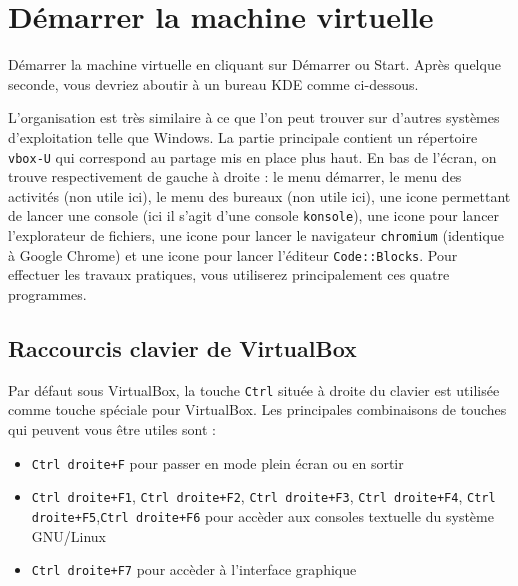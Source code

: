  
\begin{center}
\end{center}


 \section{Démarrer la machine virtuelle}

Démarrer la machine virtuelle en cliquant sur \og{}Démarrer\fg{} ou \og{}Start\fg{}. Après quelque seconde, vous devriez aboutir à un bureau KDE comme ci-dessous. 

\begin{center}
\end{center}

L'organisation est très similaire à ce que l'on peut trouver sur d'autres systèmes d'exploitation telle que Windows. La partie principale contient un répertoire \og{}\verb|vbox-U| qui correspond au partage mis en place plus haut. En bas de l'écran, on trouve respectivement de gauche à droite : le menu démarrer, le menu des activités (non utile ici), le menu des bureaux (non utile ici), une icone permettant de lancer une console (ici il s'agit d'une console \verb-konsole-), une icone pour lancer l'explorateur de fichiers, une icone pour lancer le navigateur \verb-chromium- (identique à Google Chrome) et une icone pour lancer l'éditeur \verb-Code::Blocks-.
Pour effectuer les travaux pratiques, vous utiliserez principalement ces quatre programmes.

\subsection{Raccourcis clavier de VirtualBox}
Par défaut sous VirtualBox, la touche \verb-Ctrl- située à droite du clavier est utilisée comme touche spéciale pour VirtualBox. Les principales combinaisons de touches qui peuvent vous être utiles sont :
\begin{itemize}
  \item \verb-Ctrl droite+F- pour passer en mode plein écran ou en sortir
  \item \verb-Ctrl droite+F1-, \verb-Ctrl droite+F2-, \verb-Ctrl droite+F3-, \verb-Ctrl droite+F4-, \verb-Ctrl droite+F5-,\newline \verb-Ctrl droite+F6- pour accèder aux consoles textuelle du système GNU/Linux
  \item \verb-Ctrl droite+F7- pour accèder à l'interface graphique
\end{itemize}

